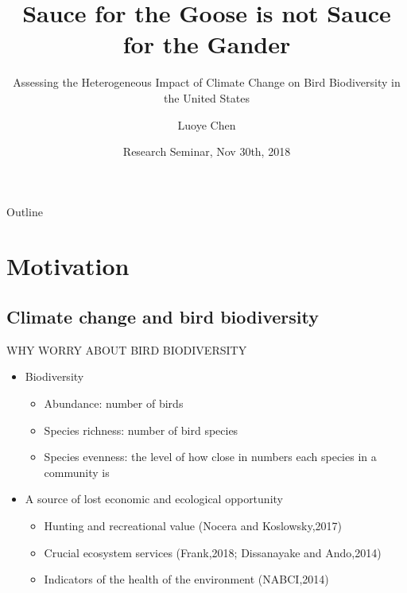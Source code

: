 \documentclass{beamer}
\title[Sauce for the Goose is not Sauce for the Gander] %
{Sauce for the Goose is not Sauce for the Gander}
\subtitle
{Assessing the Heterogeneous Impact of Climate Change on Bird Biodiversity in the United States}
\author[Luoye Chen] %
{Luoye Chen\inst{1}}
\institute[UIUC-ACE] %
{
  \inst{1}%
  Department of Agricultural and Consumer Economics\\
  University of Illinois
}
\date[CFP 2003] %
{Research Seminar, Nov 30th, 2018}
\begin{document}
\begin{frame}
  \titlepage
\end{frame}

\begin{frame}{Outline}
  \tableofcontents
\end{frame}





\section{Motivation}

\subsection{Climate change and bird biodiversity}

\begin{frame}{WHY WORRY ABOUT BIRD BIODIVERSITY}{}

  \begin{itemize}
  \item
    Biodiversity
    \begin{itemize}
      \item Abundance: number of birds
      \item Species richness: number of bird species
      \item Species evenness: the level of how close in numbers each species in a community is
    \end{itemize}
  \item
   A source of lost economic and ecological opportunity
    \begin{itemize}
      \item Hunting and recreational value (Nocera and Koslowsky,2017)
      \item Crucial ecosystem services (Frank,2018; Dissanayake and Ando,2014)
      \item Indicators of the health of the environment (NABCI,2014)
    \end{itemize}

  \end{itemize}
\end{frame}
\end{document}
